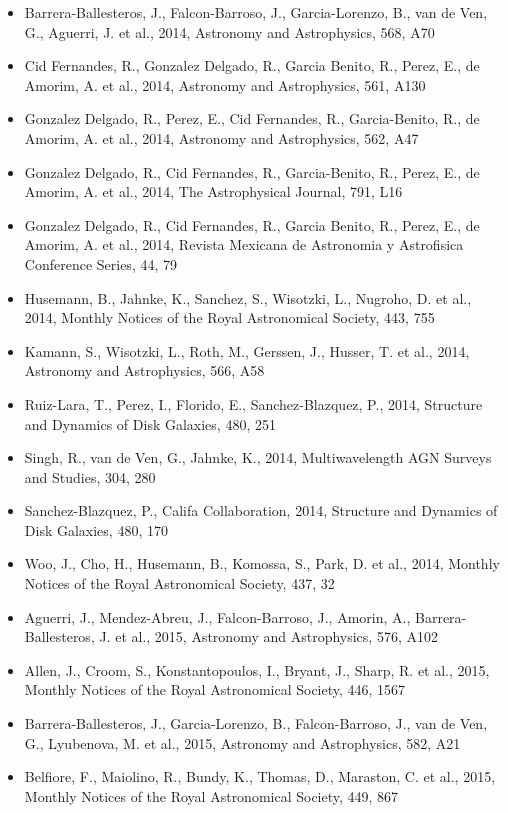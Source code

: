 \documentclass{letter}
\begin{document}
\begin{enumerate}
\begin{itemize}
\item Barrera-Ballesteros, J., Falcon-Barroso, J., Garcia-Lorenzo, B., van de Ven, G., Aguerri, J. et al., 2014, Astronomy and Astrophysics, 568, A70
\item Cid Fernandes, R., Gonzalez Delgado, R., Garcia Benito, R., Perez, E., de Amorim, A. et al., 2014, Astronomy and Astrophysics, 561, A130
\item Gonzalez Delgado, R., Perez, E., Cid Fernandes, R., Garcia-Benito, R., de Amorim, A. et al., 2014, Astronomy and Astrophysics, 562, A47
\item Gonzalez Delgado, R., Cid Fernandes, R., Garcia-Benito, R., Perez, E., de Amorim, A. et al., 2014, The Astrophysical Journal, 791, L16
\item Gonzalez Delgado, R., Cid Fernandes, R., Garcia Benito, R., Perez, E., de Amorim, A. et al., 2014, Revista Mexicana de Astronomia y Astrofisica Conference Series, 44, 79
\item Husemann, B., Jahnke, K., Sanchez, S., Wisotzki, L., Nugroho, D. et al., 2014, Monthly Notices of the Royal Astronomical Society, 443, 755
\item Kamann, S., Wisotzki, L., Roth, M., Gerssen, J., Husser, T. et al., 2014, Astronomy and Astrophysics, 566, A58
\item Ruiz-Lara, T., Perez, I., Florido, E., Sanchez-Blazquez, P., 2014, Structure and Dynamics of Disk Galaxies, 480, 251
\item Singh, R., van de Ven, G., Jahnke, K., 2014, Multiwavelength AGN Surveys and Studies, 304, 280
\item Sanchez-Blazquez, P., Califa Collaboration, 2014, Structure and Dynamics of Disk Galaxies, 480, 170
\item Woo, J., Cho, H., Husemann, B., Komossa, S., Park, D. et al., 2014, Monthly Notices of the Royal Astronomical Society, 437, 32
\item Aguerri, J., Mendez-Abreu, J., Falcon-Barroso, J., Amorin, A., Barrera-Ballesteros, J. et al., 2015, Astronomy and Astrophysics, 576, A102
\item Allen, J., Croom, S., Konstantopoulos, I., Bryant, J., Sharp, R. et al., 2015, Monthly Notices of the Royal Astronomical Society, 446, 1567
\item Barrera-Ballesteros, J., Garcia-Lorenzo, B., Falcon-Barroso, J., van de Ven, G., Lyubenova, M. et al., 2015, Astronomy and Astrophysics, 582, A21
\item Belfiore, F., Maiolino, R., Bundy, K., Thomas, D., Maraston, C. et al., 2015, Monthly Notices of the Royal Astronomical Society, 449, 867

\end{itemize}
\end{enumerate}
\end{document}

